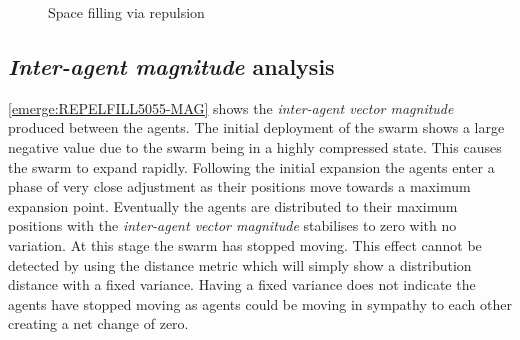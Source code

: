 \begin{figure}[H]
{	 \label{emerge:Repel52-5}
}
\caption{Space filling via repulsion}
\label{emerge:SwarmFloodRepel}
\end{figure}

\subsection{\textit{Inter-agent magnitude} analysis}
\autoref{emerge:REPELFILL5055-MAG} shows the \textit{inter-agent vector magnitude} produced between the agents. The initial deployment of the swarm shows a large negative value due to the swarm being in a highly compressed state. This causes the swarm to expand rapidly. Following the initial expansion the agents enter a phase of very close adjustment as their positions move towards a maximum expansion point. Eventually the agents are distributed to their maximum positions with the \textit{inter-agent vector magnitude} stabilises to zero with no variation. At this stage the swarm has stopped moving. This effect cannot be detected by using the distance metric which will simply show a distribution distance with a fixed variance. Having a fixed variance does not indicate the agents have stopped moving as agents could be moving in sympathy to each other creating a net change of zero.


